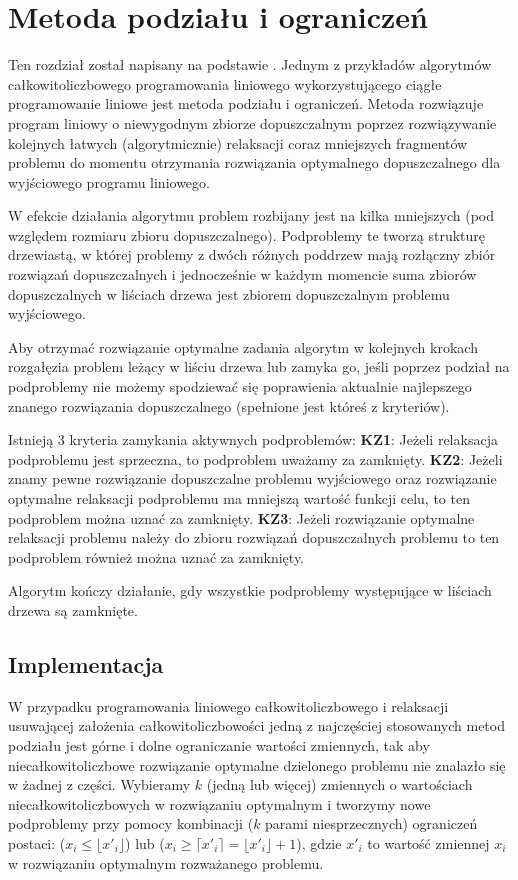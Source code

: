 \documentclass[licencjacka]{pracamgr}
\begin{document}
   \section{Metoda podziału i ograniczeń}
Ten rozdział został napisany na podstawie \cite{ZO}.\newline
Jednym z przykładów algorytmów całkowitoliczbowego programowania liniowego wykorzystującego ciągłe programowanie liniowe jest metoda podziału i ograniczeń.
Metoda rozwiązuje program liniowy o niewygodnym zbiorze dopuszczalnym poprzez rozwiązywanie kolejnych łatwych (algorytmicznie) relaksacji coraz mniejszych fragmentów problemu
do momentu otrzymania rozwiązania optymalnego dopuszczalnego dla wyjściowego programu liniowego.

W efekcie działania algorytmu problem rozbijany jest na kilka mniejszych (pod względem rozmiaru zbioru dopuszczalnego). Podproblemy te tworzą strukturę drzewiastą, w której
problemy z dwóch różnych poddrzew mają rozłączny zbiór rozwiązań dopuszczalnych
i jednocześnie w każdym momencie suma zbiorów dopuszczalnych w liściach drzewa jest zbiorem dopuszczalnym problemu wyjściowego.

Aby otrzymać rozwiązanie optymalne zadania algorytm w kolejnych krokach rozgałęzia problem leżący w liściu drzewa lub zamyka go, jeśli poprzez podział na podproblemy
nie możemy spodziewać się poprawienia aktualnie najlepszego znanego rozwiązania dopuszczalnego (spełnione jest któreś z kryteriów).

Istnieją 3 kryteria zamykania aktywnych podproblemów:\newline
\textbf{KZ1}: Jeżeli relaksacja podproblemu jest sprzeczna, to podproblem uważamy za zamknięty.\newline
\textbf{KZ2}: Jeżeli znamy pewne rozwiązanie dopuszczalne problemu wyjściowego oraz rozwiązanie optymalne relaksacji podproblemu ma mniejszą wartość funkcji celu,
to ten podproblem można uznać za zamknięty.\newline
\textbf{KZ3}: Jeżeli rozwiązanie optymalne relaksacji problemu należy do zbioru rozwiązań dopuszczalnych problemu to ten podproblem również można uznać za zamknięty.

Algorytm kończy działanie, gdy wszystkie podproblemy występujące w liściach drzewa są zamknięte.\newline
%
    \subsection{Implementacja}
W przypadku programowania liniowego całkowitoliczbowego i relaksacji usuwającej założenia całkowitoliczbowości jedną z najczęściej stosowanych metod podziału
jest górne i dolne ograniczanie wartości zmiennych, tak aby niecałkowitoliczbowe rozwiązanie optymalne dzielonego problemu nie znalazło się w żadnej z części.
Wybieramy $k$ (jedną lub więcej) zmiennych o wartościach niecałkowitoliczbowych w rozwiązaniu optymalnym i tworzymy nowe podproblemy przy pomocy kombinacji
($k$ parami niesprzecznych) ograniczeń postaci:
($x_i\le\lfloor x'_i\rfloor$) lub ($x_i\ge\lceil x'_i\rceil=\lfloor x'_i\rfloor+1$), gdzie $x'_i$ to wartość zmiennej $x_i$ w rozwiązaniu optymalnym rozważanego problemu.\
\end{document}
